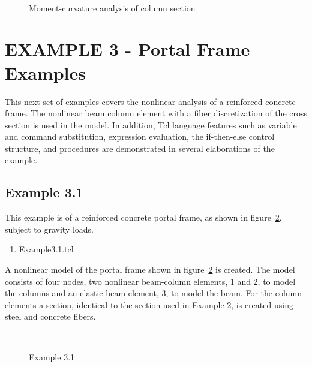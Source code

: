 \documentclass[12pt]{article}
\begin{document}
\begin{figure}[h]
\begin{center}
\leavevmode
\hbox{%
\epsfxsize=5.5in
}
\end{center}
\caption{Moment-curvature analysis of column section}
\label{momcurv}
\end{figure}



\pagebreak
\section {EXAMPLE 3 - Portal Frame Examples}

This next set of examples covers the nonlinear analysis
of a reinforced concrete frame. The nonlinear beam column element
with a fiber discretization of the cross section is used in the model.
In addition, Tcl language features
such as variable and command substitution, expression evaluation, the
if-then-else control structure, and procedures are demonstrated in 
several elaborations of the example.

\subsection{Example 3.1}
This example is of a reinforced concrete portal frame, as
shown in figure~\ref{example3}, subject to gravity loads. 

\vspace{0.2in}  
\begin{enumerate} 
\item Example3.1.tcl
\end{enumerate}

\vspace{0.2in} 

A nonlinear model of the portal frame shown in
figure~\ref{example3} is created. The model consists of four nodes, 
two nonlinear beam-column elements, 1 and 2, to model the columns and
an elastic beam element, 3, to model the beam. 
For the column elements a section, identical to the section used in
Example 2, is created using steel and concrete fibers.

\begin{figure}[h]
\begin{center}
\leavevmode
\hbox{%
\epsfxsize=5.5in
}
\end{center}
\caption{Example 3.1}
\label{example3}
\end{figure}
\end{document}
